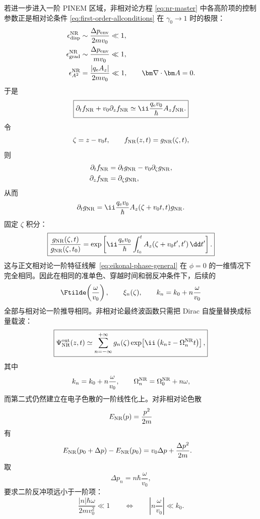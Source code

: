 若进一步进入一阶 PINEM 区域，非相对论方程 \eqref{eq:nr-master} 中各高阶项的控制参数正是相对论条件 \eqref{eq:first-order-allconditions} 在 $\gamma_0\to1$ 时的极限：
\begin{align}
\epsilon_{\rm disp}^{\rm NR}
&\sim\frac{\Delta p_{\rm env}}{2mv_0}\ll1,\\
\epsilon_{\rm grad}^{\rm NR}
&\sim\frac{\Delta p_{\rm env}}{mv_0}\ll1,\\
\epsilon_{A^2}^{\rm NR}
&=\frac{|q_{\rm e}A_z|}{2mv_0}\ll1,
\qquad
\bm\nabla\cdot\bm A=0.
\label{eq:nr-first-order-cond}
\end{align}
于是
\begin{equation}
\boxed{
\partial_tf_{\rm NR}
+v_0\partial_zf_{\rm NR}
\simeq
\ii\frac{q_{\rm e}v_0}{\hbar}A_zf_{\rm NR}.}
\label{eq:nr-first-order}
\end{equation}
令
\[
\zeta=z-v_0t,
\qquad
f_{\rm NR}(z,t)=g_{\rm NR}(\zeta,t),
\]
则
\begin{align}
\partial_tf_{\rm NR}
&=\partial_tg_{\rm NR}-v_0\partial_\zeta g_{\rm NR},\\
\partial_zf_{\rm NR}
&=\partial_\zeta g_{\rm NR},
\end{align}
从而
\begin{equation}
\partial_tg_{\rm NR}
=
\ii\frac{q_{\rm e}v_0}{\hbar}
A_z(\zeta+v_0t,t)g_{\rm NR}.
\end{equation}
固定 $\zeta$ 积分：
\begin{equation}
\boxed{
\frac{g_{\rm NR}(\zeta,t)}
{g_{\rm NR}(\zeta,t_0)}
=
\exp\left[
\ii\frac{q_{\rm e}v_0}{\hbar}
\int_{t_0}^{t}
A_z(\zeta+v_0t',t')\,\dd t'
\right].}
\label{eq:nr-path-phase}
\end{equation}
这与正文相对论一阶特征线解~\eqref{eq:eikonal-phase-general} 在 $\phi=0$ 的一维情况下完全相同。因此在相同的准单色、穿越时间和弱反冲条件下，后续的
\[
\Ftilde\!\left(\frac{\omega}{v_0}\right),
\qquad
\xi_n(\zeta),
\qquad
k_n=k_0+n\frac{\omega}{v_0}
\]
全部与相对论一阶推导相同。非相对论最终波函数只需把 Dirac 自旋量替换成标量载波：
\begin{equation}
\boxed{
\Psi_{\rm NR}^{\rm out}(z,t)
\simeq
\sum_{n=-\infty}^{+\infty}
g_n(\zeta)
\exp\!\left[
\ii\left(
k_nz-\Omega_n^{\rm NR}t
\right)
\right],}
\label{eq:nr-out}
\end{equation}
其中
\begin{equation}
k_n=k_0+n\frac{\omega}{v_0},
\qquad
\Omega_n^{\rm NR}
=\Omega_0^{\rm NR}+n\omega,
\label{eq:nr-sidebands}
\end{equation}
而第二式仍然建立在电子色散的一阶线性化上。对非相对论色散
\[
E_{\rm NR}(p)=\frac{p^2}{2m}
\]
有
\begin{align}
E_{\rm NR}(p_0+\Delta p)-E_{\rm NR}(p_0)
&=v_0\Delta p+\frac{\Delta p^2}{2m}.
\end{align}
取
\[
\Delta p_n=n\hbar\frac{\omega}{v_0},
\]
要求二阶反冲项远小于一阶项：
\begin{equation}
\boxed{
\frac{|n|\hbar\omega}{2mv_0^2}\ll1
\qquad\Longleftrightarrow\qquad
\left|n\frac{\omega}{v_0}\right|\ll k_0.}
\label{eq:nr-recoil}
\end{equation}


